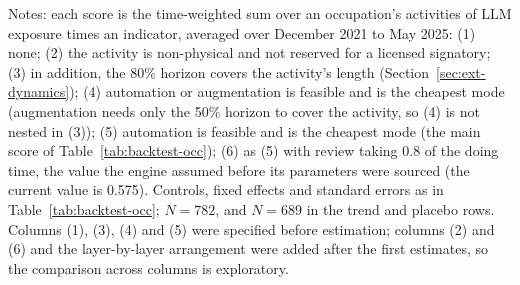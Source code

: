 \begin{table}[tbp]
\begin{tabular}{@{}lcccccc@{}}
\bottomrule
\end{tabular}
\smallskip
\begin{minipage}{0.97\linewidth}\footnotesize
Notes: each score is the time-weighted sum over an occupation's activities of LLM exposure times an indicator, averaged over December 2021 to May 2025: (1) none; (2) the activity is non-physical and not reserved for a licensed signatory; (3) in addition, the 80\% horizon covers the activity's length (Section~\ref{sec:ext-dynamics}); (4) automation or augmentation is feasible and is the cheapest mode (augmentation needs only the 50\% horizon to cover the activity, so (4) is not nested in (3)); (5) automation is feasible and is the cheapest mode (the main score of Table~\ref{tab:backtest-occ}); (6) as (5) with review taking 0.8 of the doing time, the value the engine assumed before its parameters were sourced (the current value is 0.575). Controls, fixed effects and standard errors as in Table~\ref{tab:backtest-occ}; $N=782$, and $N=689$ in the trend and placebo rows. Columns (1), (3), (4) and (5) were specified before estimation; columns (2) and (6) and the layer-by-layer arrangement were added after the first estimates, so the comparison across columns is exploratory.
\end{minipage}
\end{table}

